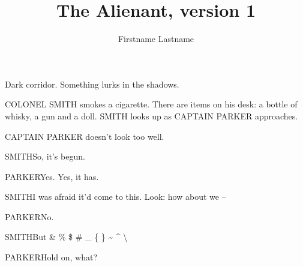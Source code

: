 \documentclass{screenplay}
\title{The Alienant, version 1}
\author{Firstname Lastname}
\begin{document}
\coverpage
\fadein
{}

Dark corridor. Something lurks in the shadows.


COLONEL SMITH smokes a cigarette. There are items on his desk: a bottle of whisky, a gun and a doll. SMITH looks up as CAPTAIN PARKER approaches.

CAPTAIN PARKER doesn't look too well.

\begin{dialogue}{SMITH}So, it's begun.\end{dialogue}

\begin{dialogue}{PARKER}Yes.  Yes, it has.\end{dialogue}

\begin{dialogue}{SMITH}I was afraid it'd come to this. Look: how about we –\end{dialogue}

\begin{dialogue}{PARKER}No.\end{dialogue}

\begin{dialogue}{SMITH}But \& \% \$ \# \_ \{ \} \textasciitilde{} \textasciicircum{} \textbackslash\end{dialogue}

\begin{dialogue}{PARKER}Hold on, what?\end{dialogue}

\fadeout
\theend
\end{document}
